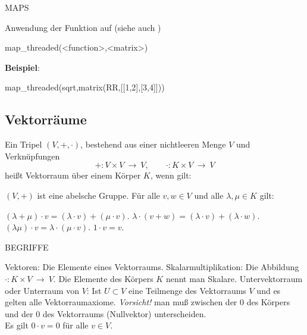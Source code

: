 \documentclass[fontsize=12pt,paper=a4,twoside,bibtotoc,idxtotoc,
liststotoc,pagesize,BCOR1.2cm,DIV15,chapterprefix,pagesize=pdftex]{scrbook}
\theoremstyle{plain}
\theoremstyle{definition}
\theoremstyle{remark}
\begin{document}


MAPS

Anwendung der Funktion  auf  (siehe auch )\\
\begin{sagein}
map_threaded(<function>,<matrix>)
\end{sagein}
\textbf{Beispiel}:
\begin{sagein}
map_threaded(sqrt,matrix(RR,[[1,2],[3,4]]))
\end{sagein}
  	
\begin{sage}
[1.00000000000000 1.41421356237310]
[1.73205080756888 2.00000000000000] 
\end{sage}

\subsection{Vektorräume}

Ein Tripel $(V,+,\cdot)$, bestehend aus einer nichtleeren Menge $V$
und Verknüpfungen
\[ +:V \times V \ \rightarrow \ V, \qquad \cdot:K\times V \ \rightarrow \ V\]
heißt {\color{red} Vektorraum} über einem Körper
$K$, wenn gilt:

 $(V,+)$ ist eine abelsche Gruppe.
 Für alle $v,w \in V$ und alle $\lambda, \mu \in K$ gilt:

  $(\lambda + \mu) \cdot v  =(\lambda \cdot v) + ( \mu \cdot v)$.
 $\lambda \cdot (v + w )  = ( \lambda \cdot v) + ( \lambda \cdot w)$.
 $(\lambda \mu) \cdot v = \lambda \cdot (\mu \cdot v)$.
 $1 \cdot v = v$.



BEGRIFFE


 {\color{red} Vektoren}: Die Elemente eines Vektorraums.
 {\color{red} Skalarmultiplikation}: Die Abbildung $\cdot : K\times V \ \rightarrow \ V$. Die Elemente des Körpers $K$ nennt man
  {\color{red} Skalare}.
 {\color{red} Untervektorraum} oder {\color{red} Unterraum} von $V$: Ist $U \subset V$ eine Teilmenge des Vektorraums $V$ und es gelten
  alle Vektorraumaxiome.
 \emph{Vorsicht!} man muß zwischen der $0$ des Körpers und der $0$ des Vektorraums (Nullvektor) unterscheiden. \\
Es gilt $0 \cdot v  = 0$ für alle $v \in V$. 
\end{document}
